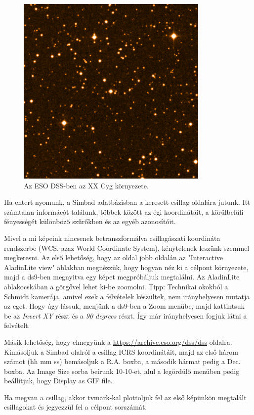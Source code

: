 \documentclass{article}
\begin{document}
\begin{figure}[!ht]
    \centering
    \includegraphics[width=0.6\linewidth]{pics/dss.png}
    \caption{Az ESO DSS-ben az XX Cyg környezete.}
    \label{dss}
\end{figure}

Ha entert nyomunk, a Simbad adatbázisban a keresett csillag oldalára jutunk.
Itt számtalan informácót találunk, többek között az égi koordinátáit, a
körülbelüli fényességét különböző szűrőkben és az egyéb azonosítóit.

Mivel a mi képeink nincsenek betranszformálva csillagászati koordináta
rendszerbe (WCS, azaz World Coordinate System), kénytelenek leszünk szemmel
megkeresni.
Az első lehetőség, hogy az oldal jobb oldalán az "Interactive AladinLite view"
ablakban megnézzük, hogy hogyan néz ki a célpont környezete, majd a ds9-ben
megnyitva egy képet megpróbáljuk megtalálni. Az AladinLite ablakocskában a
görgővel lehet ki-be zoomolni.
Tipp: Technikai okokból a Schmidt kamerája, amivel ezek a felvételek készültek,
nem irányhelyesen mutatja az eget. Hogy úgy lássuk, menjünk a ds9-ben a Zoom
menübe, majd kattintsuk be az {\it Invert XY} részt és a {\it 90 degrees} részt.
Így már irányhelyesen fogjuk látni a felvételt.

Másik lehetőség, hogy elmegyünk a \url{https://archive.eso.org/dss/dss} oldalra.
Kimásoljuk a Simbad olalról a csillag ICRS koordinátáit, majd az első három
számot (hh mm ss) bemásoljuk a R.A. boxba, a második hármat pedig a Dec. boxba.
Az Image Size sorba beírunk 10-10-et, alul a legördülő menüben pedig beállítjuk,
hogy Display as GIF file.


Ha megvan a csillag, akkor tvmark-kal plottoljuk fel az első képünkön megtalált
csillagokat és jegyezzül fel a célpont sorszámát.
\end{document}
